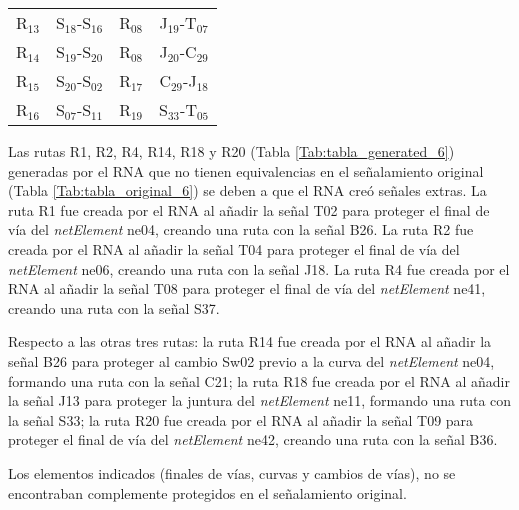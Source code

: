 \begin{table}[H]
{\begin{center}
{\begin{tabular}{ c c c c }
                    R$_{13}$ & S$_{18}$-S$_{16}$ & R$_{08}$ & J$_{19}$-T$_{07}$ \\
                    R$_{14}$ & S$_{19}$-S$_{20}$ & R$_{08}$ & J$_{20}$-C$_{29}$ \\
                    R$_{15}$ & S$_{20}$-S$_{02}$ & R$_{17}$ & C$_{29}$-J$_{18}$ \\
                    R$_{16}$ & S$_{07}$-S$_{11}$ & R$_{19}$ & S$_{33}$-T$_{05}$ \\
                \hline
            \end{tabular}
            }
            \end{center}
        }    
    \end{table}
    
    Las rutas R1, R2, R4, R14, R18 y R20 (Tabla \ref{Tab:tabla_generated_6}) generadas por el RNA que no tienen equivalencias en el señalamiento original (Tabla \ref{Tab:tabla_original_6}) se deben a que el RNA creó señales extras. La ruta R1 fue creada por el RNA al añadir la señal T02 para proteger el final de vía del \textit{netElement} ne04, creando una ruta con la señal B26. La ruta R2 fue creada por el RNA al añadir la señal T04 para proteger el final de vía del \textit{netElement} ne06, creando una ruta con la señal J18. La ruta R4 fue creada por el RNA al añadir la señal T08 para proteger el final de vía del \textit{netElement} ne41, creando una ruta con la señal S37.
    
    Respecto a las otras tres rutas: la ruta R14 fue creada por el RNA al añadir la señal B26 para proteger al cambio Sw02 previo a la curva del \textit{netElement} ne04, formando una ruta con la señal C21; la ruta R18 fue creada por el RNA al añadir la señal J13 para proteger la juntura  del \textit{netElement} ne11, formando una ruta con la señal S33; la ruta R20 fue creada por el RNA al añadir la señal T09 para proteger el final de vía del \textit{netElement} ne42, creando una ruta con la señal B36.
    
    Los elementos indicados (finales de vías, curvas y cambios de vías), no se encontraban complemente protegidos en el señalamiento original.